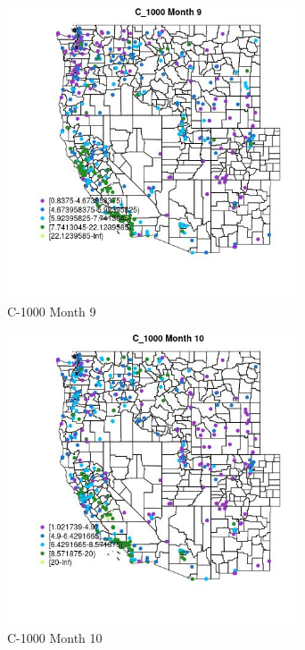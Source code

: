 \begin{figure} 
\centering  
\includegraphics[width=0.77\textwidth]{Code_Outputs/ML_input_report_ML_input_PM25_Step5_part_d_de_duplicated_aves_ML_input_MapObsMo9C_1000.jpg} 
\caption{\label{fig:ML_input_report_ML_input_PM25_Step5_part_d_de_duplicated_aves_ML_inputMapObsMo9C_1000}C-1000 Month 9} 
\end{figure} 
 

\begin{figure} 
\centering  
\includegraphics[width=0.77\textwidth]{Code_Outputs/ML_input_report_ML_input_PM25_Step5_part_d_de_duplicated_aves_ML_input_MapObsMo10C_1000.jpg} 
\caption{\label{fig:ML_input_report_ML_input_PM25_Step5_part_d_de_duplicated_aves_ML_inputMapObsMo10C_1000}C-1000 Month 10} 
\end{figure} 
 

